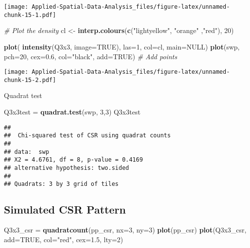 \documentclass[
]{book}
\newenvironment{Shaded}{\begin{snugshade}}{\end{snugshade}}
\newcommand{\CommentTok}[1]{\textcolor[rgb]{0.56,0.35,0.01}{\textit{#1}}}
\newcommand{\DataTypeTok}[1]{\textcolor[rgb]{0.13,0.29,0.53}{#1}}
\newcommand{\DecValTok}[1]{\textcolor[rgb]{0.00,0.00,0.81}{#1}}
\newcommand{\FloatTok}[1]{\textcolor[rgb]{0.00,0.00,0.81}{#1}}
\newcommand{\KeywordTok}[1]{\textcolor[rgb]{0.13,0.29,0.53}{\textbf{#1}}}
\newcommand{\NormalTok}[1]{#1}
\newcommand{\OtherTok}[1]{\textcolor[rgb]{0.56,0.35,0.01}{#1}}
\newcommand{\StringTok}[1]{\textcolor[rgb]{0.31,0.60,0.02}{#1}}
\begin{document}
\texttt{[image: Applied-Spatial-Data-Analysis\_files/figure-latex/unnamed-chunk-15-1.pdf]}

\begin{Shaded}
\begin{Highlighting}[]
\CommentTok{# Plot the density}
\NormalTok{cl <-}\StringTok{  }\KeywordTok{interp.colours}\NormalTok{(}\KeywordTok{c}\NormalTok{(}\StringTok{"lightyellow"}\NormalTok{, }\StringTok{"orange"}\NormalTok{ ,}\StringTok{"red"}\NormalTok{), }\DecValTok{20}\NormalTok{)}

\KeywordTok{plot}\NormalTok{( }\KeywordTok{intensity}\NormalTok{(Q3x3, }\DataTypeTok{image=}\OtherTok{TRUE}\NormalTok{), }\DataTypeTok{las=}\DecValTok{1}\NormalTok{, }\DataTypeTok{col=}\NormalTok{cl, }\DataTypeTok{main=}\OtherTok{NULL}\NormalTok{)}
\KeywordTok{plot}\NormalTok{(swp, }\DataTypeTok{pch=}\DecValTok{20}\NormalTok{, }\DataTypeTok{cex=}\FloatTok{0.6}\NormalTok{, }\DataTypeTok{col=}\StringTok{"black"}\NormalTok{, }\DataTypeTok{add=}\OtherTok{TRUE}\NormalTok{)  }\CommentTok{# Add points}
\end{Highlighting}
\end{Shaded}

\texttt{[image: Applied-Spatial-Data-Analysis\_files/figure-latex/unnamed-chunk-15-2.pdf]}

Quadrat test

\begin{Shaded}
\begin{Highlighting}[]
\NormalTok{Q3x3test =}\StringTok{ }\KeywordTok{quadrat.test}\NormalTok{(swp, }\DecValTok{3}\NormalTok{,}\DecValTok{3}\NormalTok{)}
\NormalTok{Q3x3test}
\end{Highlighting}
\end{Shaded}

\begin{verbatim}
## 
## 	Chi-squared test of CSR using quadrat counts
## 
## data:  swp
## X2 = 4.6761, df = 8, p-value = 0.4169
## alternative hypothesis: two.sided
## 
## Quadrats: 3 by 3 grid of tiles
\end{verbatim}

\hypertarget{simulated-csr-pattern}{%
\subsection{Simulated CSR Pattern}\label{simulated-csr-pattern}}

\begin{Shaded}
\begin{Highlighting}[]
\NormalTok{Q3x3_csr =}\StringTok{ }\KeywordTok{quadratcount}\NormalTok{(pp_csr, }\DataTypeTok{nx=}\DecValTok{3}\NormalTok{, }\DataTypeTok{ny=}\DecValTok{3}\NormalTok{)}
\KeywordTok{plot}\NormalTok{(pp_csr)}
\KeywordTok{plot}\NormalTok{(Q3x3_csr, }\DataTypeTok{add=}\OtherTok{TRUE}\NormalTok{, }\DataTypeTok{col=}\StringTok{"red"}\NormalTok{, }\DataTypeTok{cex=}\FloatTok{1.5}\NormalTok{, }\DataTypeTok{lty=}\DecValTok{2}\NormalTok{)}
\end{Highlighting}
\end{Shaded}
\end{document}

